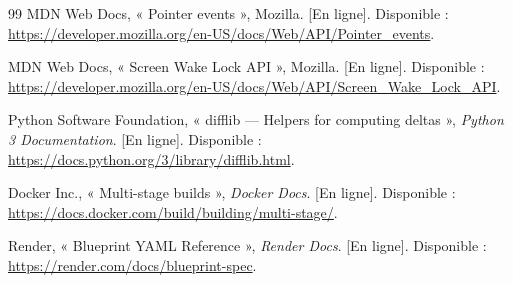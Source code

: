 \documentclass[12pt,a4paper]{report}
\begin{document}
\begin{thebibliography}{99}
 MDN Web Docs, « Pointer events », Mozilla. [En ligne]. Disponible :
\url{https://developer.mozilla.org/en-US/docs/Web/API/Pointer_events}.

 MDN Web Docs, « Screen Wake Lock API », Mozilla. [En ligne]. Disponible :
\url{https://developer.mozilla.org/en-US/docs/Web/API/Screen_Wake_Lock_API}.

 Python Software Foundation, « difflib — Helpers for computing deltas »,
\emph{Python 3 Documentation}. [En ligne]. Disponible :
\url{https://docs.python.org/3/library/difflib.html}.

 Docker Inc., « Multi-stage builds », \emph{Docker Docs}. [En ligne]. Disponible :
\url{https://docs.docker.com/build/building/multi-stage/}.

 Render, « Blueprint YAML Reference », \emph{Render Docs}. [En ligne]. Disponible :
\url{https://render.com/docs/blueprint-spec}.

\end{thebibliography}
\end{document}
